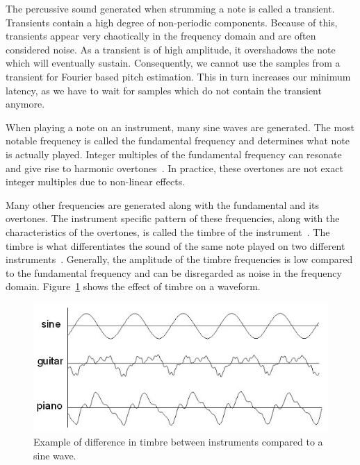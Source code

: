 \documentclass[a4paper,10pt,twocolumn]{article}
\begin{document}
The percussive sound generated when strumming a note is called a transient. Transients contain a high degree of non-periodic components. Because of this, transients appear very chaotically in the frequency domain and are often considered noise. As a transient is of high amplitude, it overshadows the note which will eventually sustain. Consequently, we cannot use the samples from a transient for Fourier based pitch estimation. This in turn increases our minimum latency, as we have to wait for samples which do not contain the transient anymore.

When playing a note on an instrument, many sine waves are generated. The most notable frequency is called the fundamental frequency and determines what note is actually played. Integer multiples of the fundamental frequency can resonate and give rise to harmonic overtones~\cite{overtones}. In practice, these overtones are not exact integer multiples due to non-linear effects.

Many other frequencies are generated along with the fundamental and its overtones. The instrument specific pattern of these frequencies, along with the characteristics of the overtones, is called the timbre of the instrument~\cite{timbre}. The timbre is what differentiates the sound of the same note played on two different instruments~\cite{perception}. Generally, the amplitude of the timbre frequencies is low compared to the fundamental frequency and can be disregarded as noise in the frequency domain. Figure~\ref{fig:timbre} shows the effect of timbre on a waveform.
\begin{figure}[h]
    \centering
    \includegraphics[width=\linewidth]{fig/timbre.jpg}
    \caption{Example of difference in timbre between instruments compared to a sine wave.}
    \label{fig:timbre}
\end{figure}
\end{document}
